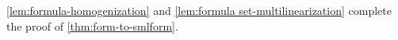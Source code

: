\autoref{lem:formula-homogenization} and \autoref{lem:formula set-multilinearization} complete the proof of \autoref{thm:form-to-smlform}. 






